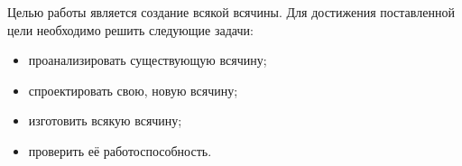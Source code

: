 \Introduction

Целью работы является создание всякой всячины. Для достижения поставленной цели необходимо решить следующие задачи:

\begin{itemize}
\item проанализировать существующую всячину;
\item спроектировать свою, новую всячину;
\item изготовить всякую всячину;
\item проверить её работоспособность.
\end{itemize}
